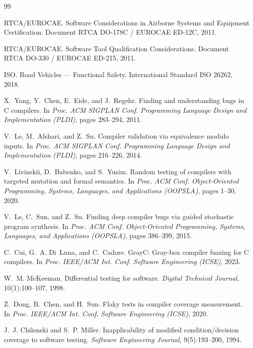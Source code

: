 \documentclass[sigconf,review,anonymous=false]{acmart}
\theoremstyle{definition}
\begin{document}

\begin{thebibliography}{99}

RTCA/EUROCAE.
\newblock Software Considerations in Airborne Systems and Equipment Certification.
\newblock Document RTCA DO-178C / EUROCAE ED-12C, 2011.

RTCA/EUROCAE.
\newblock Software Tool Qualification Considerations.
\newblock Document RTCA DO-330 / EUROCAE ED-215, 2011.

ISO.
\newblock Road Vehicles — Functional Safety.
\newblock International Standard ISO 26262, 2018.

X.~Yang, Y.~Chen, E.~Eide, and J.~Regehr.
\newblock Finding and understanding bugs in C compilers.
\newblock In \emph{Proc. ACM SIGPLAN Conf. Programming Language Design and Implementation (PLDI)}, pages 283--294, 2011.

V.~Le, M.~Afshari, and Z.~Su.
\newblock Compiler validation via equivalence modulo inputs.
\newblock In \emph{Proc. ACM SIGPLAN Conf. Programming Language Design and Implementation (PLDI)}, pages 216--226, 2014.

V.~Livinskii, D.~Babenko, and S.~Yusim.
\newblock Random testing of compilers with targeted mutation and formal semantics.
\newblock In \emph{Proc. ACM Conf. Object-Oriented Programming, Systems, Languages, and Applications (OOPSLA)}, pages 1--30, 2020.

V.~Le, C.~Sun, and Z.~Su.
\newblock Finding deep compiler bugs via guided stochastic program synthesis.
\newblock In \emph{Proc. ACM Conf. Object-Oriented Programming, Systems, Languages, and Applications (OOPSLA)}, pages 386--399, 2015.

C.~Cui, G.~A. Di~Luna, and C.~Cadore.
\newblock GrayC: Gray-box compiler fuzzing for C compilers.
\newblock In \emph{Proc. IEEE/ACM Int. Conf. Software Engineering (ICSE)}, 2023.

W.~M. McKeeman.
\newblock Differential testing for software.
\newblock \emph{Digital Technical Journal}, 10(1):100--107, 1998.

Z.~Dong, B.~Chen, and H.~Sun.
\newblock Flaky tests in compiler coverage measurement.
\newblock In \emph{Proc. IEEE/ACM Int. Conf. Software Engineering (ICSE)}, 2020.

J.~J. Chilenski and S.~P. Miller.
\newblock Inapplicability of modified condition/decision coverage to software testing.
\newblock \emph{Software Engineering Journal}, 9(5):193--200, 1994.


\end{thebibliography}
\end{document}
